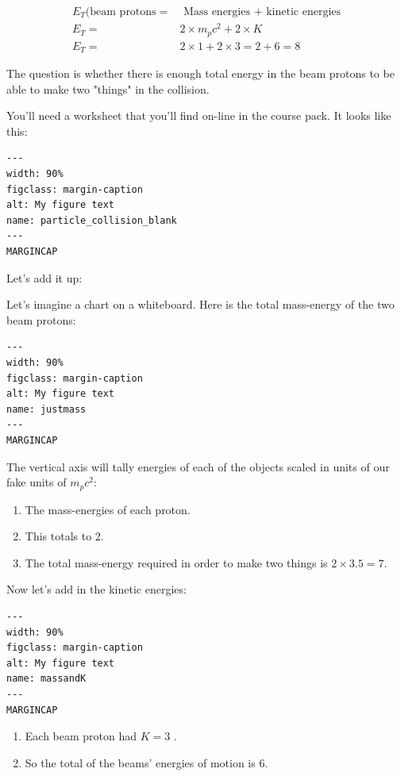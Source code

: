 \documentclass[
]{article}
\begin{document}
\begin{align*}
E_T(\text{beam protons} =& \text{ Mass energies } + \text{ kinetic energies} \\
E_T =& 2 \times m_pc^2 + 2 \times K \\
E_T =& 2 \times 1 + 2 \times 3 = 2 + 6 = 8
\end{align*}

The question is whether there is enough total energy in the beam protons
to be able to make two "things" in the collision.

You'll need a worksheet that you'll find on-line in the course pack. It
looks like this:

\begin{verbatim}
---
width: 90%
figclass: margin-caption
alt: My figure text
name: particle_collision_blank
---
MARGINCAP
\end{verbatim}

Let's add it up:

Let's imagine a chart on a whiteboard. Here is the total mass-energy of
the two beam protons:

\begin{verbatim}
---
width: 90%
figclass: margin-caption
alt: My figure text
name: justmass
---
MARGINCAP
\end{verbatim}

The vertical axis will tally energies of each of the objects scaled in
units of our fake units of \(m_pc^2\):

\begin{enumerate}
\def\labelenumi{\arabic{enumi}.}
\item
  The mass-energies of each proton.
\item
  This totals to 2.
\item
  The total mass-energy required in order to make two things is
  \(2 \times 3.5 = 7\).
\end{enumerate}

Now let's add in the kinetic energies:

\begin{verbatim}
---
width: 90%
figclass: margin-caption
alt: My figure text
name: massandK
---
MARGINCAP
\end{verbatim}

\begin{enumerate}
\def\labelenumi{\arabic{enumi}.}
\item
  Each beam proton had \(K=3\) .
\item
  So the total of the beams' energies of motion is 6.
\end{enumerate}
\end{document}
